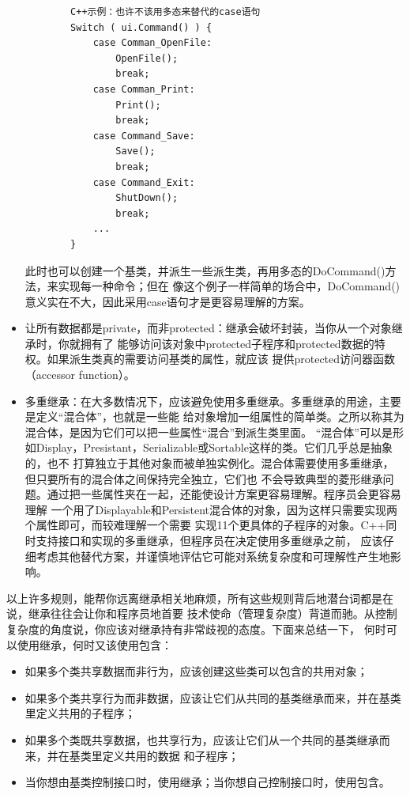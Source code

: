 \documentclass{article}
\begin{document}
\begin{itemize}
    \begin{lstlisting}
        C++示例：也许不该用多态来替代的case语句
        Switch ( ui.Command() ) {
            case Comman_OpenFile:
                OpenFile();
                break;
            case Comman_Print:
                Print();
                break;
            case Command_Save:
                Save();
                break;
            case Command_Exit:
                ShutDown();
                break;
            ...
        }
    \end{lstlisting}
    此时也可以创建一个基类，并派生一些派生类，再用多态的DoCommand()方法，来实现每一种命令；但在
    像这个例子一样简单的场合中，DoCommand()意义实在不大，因此采用case语句才是更容易理解的方案。
    \item 让所有数据都是private，而非protected：继承会破坏封装，当你从一个对象继承时，你就拥有了
    能够访问该对象中protected子程序和protected数据的特权。如果派生类真的需要访问基类的属性，就应该
    提供protected访问器函数（accessor function）。
    \item 多重继承：在大多数情况下，应该避免使用多重继承。多重继承的用途，主要是定义“混合体”，也就是一些能
    给对象增加一组属性的简单类。之所以称其为混合体，是因为它们可以把一些属性“混合”到派生类里面。
    “混合体”可以是形如Display，Presistant，Serializable或Sortable这样的类。它们几乎总是抽象的，也不
    打算独立于其他对象而被单独实例化。混合体需要使用多重继承，但只要所有的混合体之间保持完全独立，它们也
    不会导致典型的菱形继承问题。通过把一些属性夹在一起，还能使设计方案更容易理解。程序员会更容易理解
    一个用了Displayable和Persistent混合体的对象，因为这样只需要实现两个属性即可，而较难理解一个需要
    实现11个更具体的子程序的对象。C++同时支持接口和实现的多重继承，但程序员在决定使用多重继承之前，
    应该仔细考虑其他替代方案，并谨慎地评估它可能对系统复杂度和可理解性产生地影响。
\end{itemize}
\par
以上许多规则，能帮你远离继承相关地麻烦，所有这些规则背后地潜台词都是在说，继承往往会让你和程序员地首要
技术使命（管理复杂度）背道而驰。从控制复杂度的角度说，你应该对继承持有非常歧视的态度。下面来总结一下，
何时可以使用继承，何时又该使用包含：
\begin{itemize}
    \item 如果多个类共享数据而非行为，应该创建这些类可以包含的共用对象；
    \item 如果多个类共享行为而非数据，应该让它们从共同的基类继承而来，并在基类里定义共用的子程序；
    \item 如果多个类既共享数据，也共享行为，应该让它们从一个共同的基类继承而来，并在基类里定义共用的数据
    和子程序；
    \item 当你想由基类控制接口时，使用继承；当你想自己控制接口时，使用包含。
\end{itemize}
\end{document}
